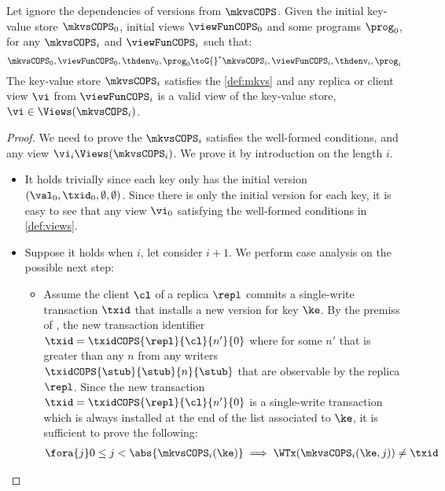 \begin{theorem}
    Let ignore the dependencies of versions from \( \mkvsCOPS \).
    Given the initial key-value store \( \mkvsCOPS_0 \), initial views \( \viewFunCOPS_0 \) and some programs \( \prog_0 \), for any \( \mkvsCOPS_i \) and \( \viewFunCOPS_i \)  such that: 
    \[
        \mkvsCOPS_0, \viewFunCOPS_0, \thdenv_0, \prog_0 {\toG{}}^* \mkvsCOPS_i, \viewFunCOPS_i, \thdenv_i, \prog_i
    \]
    The key-value store \( \mkvsCOPS_i \) satisfies the \cref{def:mkvs} and any replica or client view \( \vi \) from \( \viewFunCOPS_i \) is a valid view of the key-value store, \ie \( \vi \in \Views(\mkvsCOPS_i) \).
\end{theorem}
\begin{proof}
    We need to prove the  \( \mkvsCOPS_i \) satisfies the well-formed conditions,
    and any view \( \vi_i \Views(\mkvsCOPS_i) \).
    We prove it by introduction on the length \( i \).
    \begin{itemize}
    \item {}
        It holds trivially since each key only has the initial version \( (\val_0,\txid_0,\emptyset, \emptyset) \).
        Since there is only the initial version for each key, it is easy to see that any view \( \vi_0 \) satisfying the well-formed conditions in \cref{def:views}.
    \item {}
        Suppose it holds when \( i \), let consider \( i + 1 \).
        We perform case analysis on the possible next step:
        \begin{itemize}
            \item {}
                Assume the client \( \cl \) of a replica \( \repl \) commits a single-write transaction \( \txid \) that installs a new version for key \( \ke \).
                By the premiss of , the new transaction identifier \( \txid = \txidCOPS{\repl}{\cl}{n'}{0} \) where for some \( n' \) that is greater than any \( n \) from any writers \( \txidCOPS{\stub}{\stub}{n}{\stub} \) that are observable by the replica \( \repl \).
                Since the new transaction \( \txid = \txidCOPS{\repl}{\cl}{n'}{0} \) is a single-write transaction which is always installed at the end of the list associated to \( \ke \), it is sufficient to prove the following:
                \begin{gather}
                    \fora{j} 0 \leq j < \abs{ \mkvsCOPS_i(\ke) } \implies \WTx(\mkvsCOPS_{i}(\ke, j)) \neq \txid \label{equ:write-trans-unique} \\

\end{gather}
\end{itemize}
\end{itemize}
\end{proof}
